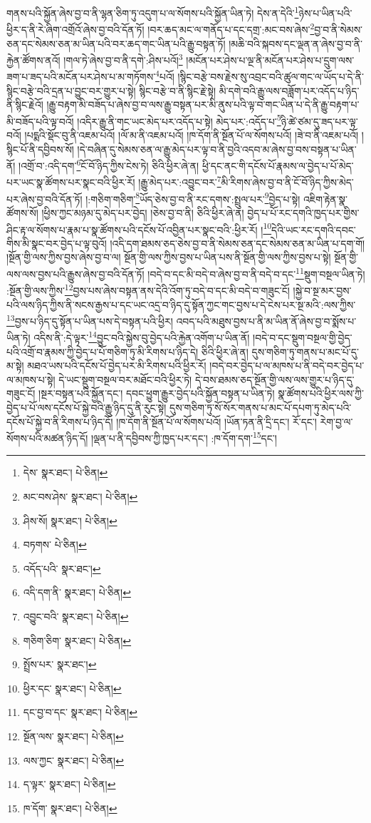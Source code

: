 གནས་པའི་སྐྱོན་ཞེས་བྱ་བ་ནི་ལྷན་ཅིག་ཏུ་འདུག་པ་ལ་སོགས་པའི་སྐྱོན་ཡིན་ཏེ། དེས་ན་དེའི་\footnote{དེས་  སྣར་ཐང་།  པེ་ཅིན། }ཉེས་པ་ཡིན་པའི་ཕྱིར་ད་ནི་རེ་ཞིག་འགྲོའོ་ཞེས་བྱ་བའི་དོན་ཏོ། །བར་ཆད་མང་ལ་གནོད་པ་དང་དགྲ་:མང་བས་ཞེས་\footnote{མང་བས་ཤེས་  སྣར་ཐང་།  པེ་ཅིན། }བྱ་བ་ནི་སེམས་ཅན་དང་སེམས་ཅན་མ་ཡིན་པའི་བར་ཆད་གང་ཡིན་པའི་རྒྱུ་བསྟན་ཏོ། །མཆི་བའི་སྐབས་དང་ལྡན་ན་ཞེས་བྱ་བ་ནི་རྐྱེན་ཚོགས་ནའོ། །གལ་ཏེ་ཞེས་བྱ་བ་ནི་དགེ་:ཤིས་པའོ།\footnote{ཤིས་སོ།  སྣར་ཐང་།  པེ་ཅིན། } །མངོན་པར་ཤེས་པ་ལྔ་ནི་མངོན་པར་ཤེས་པ་དྲུག་ལས་ཟག་པ་ཟད་པའི་མངོན་པར་ཤེས་པ་མ་གཏོགས་\footnote{བཏགས་  པེ་ཅིན། }པའོ། །སྙིང་བརྩེ་བས་རྗེས་སུ་འབྲང་བའི་ཚུལ་གང་ལ་ཡོད་པ་དེ་ནི་སྙིང་བརྩེ་བའི་དྲན་པ་བྱུང་བར་གྱུར་པ་སྟེ། སྙིང་བརྩེ་བ་ནི་སྙིང་རྗེ་སྟེ། མི་དགེ་བའི་རྒྱུ་ལས་བཟློག་པར་འདོད་པ་ཉིད་ནི་སྙིང་རྗེའོ། །རྒྱུ་བརྟག་མི་བཟོད་པ་ཞེས་བྱ་བ་ལས་རྒྱུ་བསྟན་པར་མི་ནུས་པའི་ལྟ་བ་གང་ཡིན་པ་དེ་ནི་རྒྱུ་བརྟག་པ་མི་བཟོད་པའི་ལྟ་བའོ། །འདིར་རྒྱུ་ནི་གང་ཡང་མེད་པར་འདོད་པ་སྟེ། མེད་པར་:འདོད་པ་\footnote{འདོད་པའི་  སྣར་ཐང་། }ཉི་ཚེ་ཙམ་དུ་ཟད་པར་ལྟ་བའོ། །པདྨའི་སྡོང་བུ་ནི་འཇམ་པའོ། །ལོ་མ་ནི་འཇམ་པའོ། །ཁ་དོག་ནི་སྔོན་པོ་ལ་སོགས་པའོ། །ཟེ་བ་ནི་འཇམ་པའོ། །སྙིང་པོ་ནི་དབྱིབས་སོ། །དེ་བཞིན་དུ་སེམས་ཅན་ལ་རྒྱུ་མེད་པར་ལྟ་བ་ནི་བྱའི་འདབ་མ་ཞེས་བྱ་བས་བསྟན་པ་ཡིན་ནོ། །འགྲོ་བ་:འདི་དག་\footnote{འདི་དག་ནི་  སྣར་ཐང་།  པེ་ཅིན། }ངོ་བོ་ཉིད་ཀྱིས་ངེས་ཏེ། ཅིའི་ཕྱིར་ཞེ་ན། ཕྱི་དང་ནང་གི་དངོས་པོ་རྣམས་ལ་བྱེད་པ་པོ་མེད་པར་ཡང་སྣ་ཚོགས་པར་སྣང་བའི་ཕྱིར་རོ། །རྒྱུ་མེད་པར་:འབྱུང་བར་\footnote{འབྱུང་བའི་  སྣར་ཐང་།  པེ་ཅིན། }མི་རིགས་ཞེས་བྱ་བ་ནི་ངོ་བོ་ཉིད་ཀྱིས་མེད་པར་ཞེས་བྱ་བའི་དོན་ཏོ། །:གཅིག་གཅིག་\footnote{གཅིག་ཅིག་  སྣར་ཐང་།  པེ་ཅིན། }ཡོད་ཅེས་བྱ་བ་ནི་རང་དགས་:སྤྲུལ་པར་\footnote{སྤྲོས་པར་  སྣར་ཐང་། }བྱེད་པ་སྟེ། འཇིག་རྟེན་སྣ་ཚོགས་སོ། །ཕྱིས་ཀྱང་མཉམ་དུ་མེད་པར་བྱེད། །ཅེས་བྱ་བ་ནི། ཅིའི་ཕྱིར་ཞེ་ན། བྱེད་པ་པོ་རང་དགའི་ཁྱད་པར་གྱིས་ཤིང་རྟ་ལ་སོགས་པ་རྣམ་པ་སྣ་ཚོགས་པའི་དངོས་པོ་འབྱིན་པར་སྣང་བའི་:ཕྱིར་རོ། །\footnote{ཕྱིར་དང་  སྣར་ཐང་།  པེ་ཅིན། }དེའི་ཡང་རང་དགའི་དབང་གིས་མི་སྣང་བར་བྱེད་པ་ལྟ་བུའོ། །འདི་དག་ཐམས་ཅད་ཅེས་བྱ་བ་ནི་སེམས་ཅན་དང་སེམས་ཅན་མ་ཡིན་པ་དག་གོ། །སྔོན་གྱི་ལས་ཀྱིས་བྱས་ཞེས་བྱ་བ་ལ། སྔོན་གྱི་ལས་ཀྱིས་བྱས་པ་ཡིན་པས་ནི་སྔོན་གྱི་ལས་ཀྱིས་བྱས་པ་སྟེ། སྔོན་གྱི་ལས་ལས་བྱས་པའི་རྒྱུས་ཞེས་བྱ་བའི་དོན་ཏོ། །བདེ་བ་དང་མི་བདེ་བ་ཞེས་བྱ་བ་ནི་བདེ་བ་དང་\footnote{དང་བྱ་བ་དང་  སྣར་ཐང་།  པེ་ཅིན། }སྡུག་བསྔལ་ཡིན་ཏེ། :སྔོན་གྱི་ལས་ཀྱིས་\footnote{སྔོན་ལས་  སྣར་ཐང་།  པེ་ཅིན། }བྱས་པས་ཞེས་བསྟན་ནས་དེའི་འོག་ཏུ་བདེ་བ་དང་མི་བདེ་བ་གཟུང་ངོ། །སྐྱེ་བ་སྔ་མར་བྱས་པའི་ལས་ཉིད་ཀྱིས་ནི་སངས་རྒྱས་པ་དང་ཡང་འདྲ་བ་ཉིད་དུ་སྟོན་ཀྱང་གང་བྱས་པ་དེ་ངེས་པར་སྔ་མའི་:ལས་ཀྱིས་\footnote{ལས་ཀྱང་  སྣར་ཐང་།  པེ་ཅིན། }བྱས་པ་ཉིད་དུ་སྟོན་པ་ཡིན་པས་དེ་བསྟན་པའི་ཕྱིར། འབད་པའི་མཐུས་བྱས་པ་ནི་མ་ཡིན་ནོ་ཞེས་བྱ་བ་སྨོས་པ་ཡིན་ཏེ། འདིས་ནི་:དེ་ལྟར་\footnote{ད་ལྟར་  སྣར་ཐང་།  པེ་ཅིན། }བྱུང་བའི་སྐྱེས་བུ་བྱེད་པའི་རྐྱེན་འགོག་པ་ཡིན་ནོ། །བདེ་བ་དང་སྡུག་བསྔལ་གྱི་བྱེད་པའི་འགྲོ་བ་རྣམས་ཀྱི་བྱེད་པ་པོ་གཅིག་ཏུ་མི་རིགས་པ་ཉིད་དེ། ཅིའི་ཕྱིར་ཞེ་ན། དུས་གཅིག་ཏུ་གནས་པ་མང་པོ་དུ་མ་སྟེ། མཐའ་ཡས་པའི་དངོས་པོ་བྱེད་པར་མི་རིགས་པའི་ཕྱིར་རོ། །བདེ་བར་བྱེད་པ་ལ་མཁས་པ་ནི་བདེ་བར་བྱེད་པ་ལ་མཁས་པ་སྟེ། དེ་ཡང་སྡུག་བསྔལ་བར་མཐོང་བའི་ཕྱིར་ཏེ། དེ་བས་ཐམས་ཅད་སྔོན་གྱི་ལས་ལས་གྱུར་པ་ཉིད་དུ་གཟུང་ངོ། །སྔར་བསྟན་པའི་སྐྱོན་དང་། དབང་ཕྱུག་རྒྱུར་བྱེད་པའི་སྐྱོན་བསྟན་པ་ཡིན་ཏེ། སྣ་ཚོགས་པའི་ཕྱིར་ལས་ཀྱི་བྱེད་པ་པོ་ལས་དངོས་པོ་སྐྱེ་བའི་རྒྱུ་ཉིད་དུ་ནི་རུང་སྟེ། དུས་གཅིག་ཏུ་སོ་སོར་གནས་པ་མང་པོ་དཔག་ཏུ་མེད་པའི་དངོས་པོ་སྐྱེ་བ་ནི་རིགས་པ་ཉིད་དོ། །ཁ་དོག་ནི་སྔོན་པོ་ལ་སོགས་པའོ། །ཡོན་ཏན་ནི་དྲི་དང་། རོ་དང་། རེག་བྱ་ལ་སོགས་པའི་མཚན་ཉིད་དོ། །ལྡན་པ་ནི་དབྱིབས་ཀྱི་ཁྱད་པར་དང་། :ཁ་དོག་དག་\footnote{ཁ་དོག་  སྣར་ཐང་།  པེ་ཅིན། }དང་། 